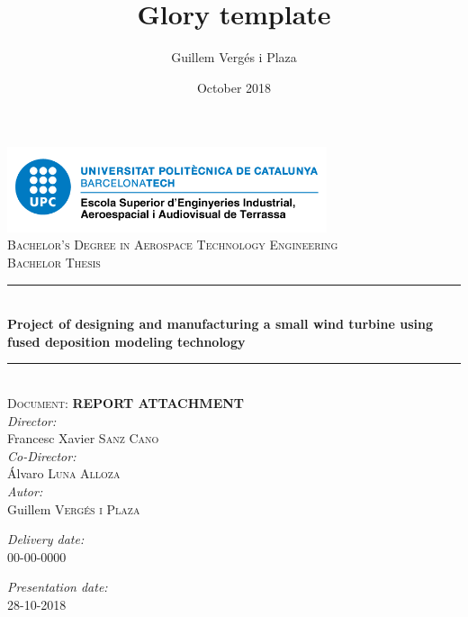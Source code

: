 \documentclass[11pt, a4paper, twoside]{book}
\title{Glory template}
\author{Guillem Vergés i Plaza }
\date{October 2018}
\newcommand\blankpage{%
	\null
	\thispagestyle{empty}%
	\addtocounter{page}{-1}%
	\newpage}
\begin{document}

\begin{titlepage}
\newcommand{\HRule}{\rule{\linewidth}{0.5mm}}
\center
\includegraphics[height=2.5cm]{Logo_escola.png}\\[1.5cm]

\textsc{\Large Bachelor's Degree in Aerospace Technology Engineering}\\[0.7cm]
\textsc{\Large Bachelor Thesis}\\
\HRule \\[0.4cm]
{\Large \bfseries Project of designing and manufacturing a small wind turbine using fused deposition modeling technology }\\[0.1cm]
\HRule \\[0.4cm]
\textsc{\large Document: \textbf{REPORT ATTACHMENT}}\\[1.5cm]
\large \emph{Director:}\\[0.5cm] 
Francesc Xavier \textsc{Sanz Cano}\\
[1cm]
\large \emph{Co-Director:}\\[0.5cm] 
Álvaro \textsc{Luna Alloza}\\
[1.5cm]
\large \emph{Autor:}\\[0.5cm] 
Guillem \textsc{Vergés i Plaza}\\
[1cm]
\vfill


\afterpage{\blankpage}

\begin{minipage}{0.4\textwidth}
\begin{flushleft} \large
\emph{Delivery date:}\\[0.2cm] 00-00-0000
\end{flushleft}
\end{minipage}
\begin{minipage}{0.4\textwidth}
\begin{flushright} \large
\emph{Presentation date:}\\[0.2cm] 28-10-2018
\end{flushright}
\end{minipage}
\end{titlepage}
\end{document}
